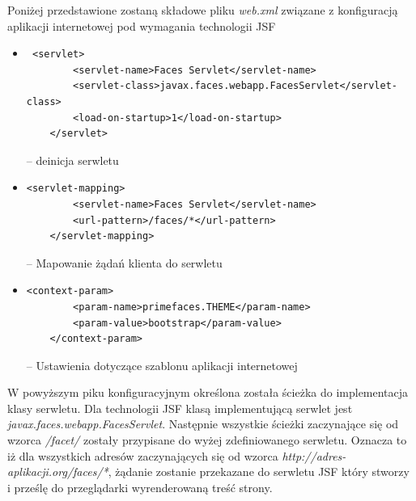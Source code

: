 Poniżej przedstawione zostaną składowe pliku \textit{web.xml} związane z konfiguracją aplikacji internetowej pod wymagania technologii JSF

\begin{itemize}
	\item  {\footnotesize \begin{verbatim} <servlet>
        <servlet-name>Faces Servlet</servlet-name>
        <servlet-class>javax.faces.webapp.FacesServlet</servlet-class>
        <load-on-startup>1</load-on-startup>
    </servlet> \end{verbatim}} -- deinicja serwletu
 	\item  {\footnotesize \begin{verbatim}<servlet-mapping>
        <servlet-name>Faces Servlet</servlet-name>
        <url-pattern>/faces/*</url-pattern>
    </servlet-mapping>\end{verbatim}} -- Mapowanie żądań klienta do serwletu
    
    \item  {\footnotesize \begin{verbatim}<context-param>
        <param-name>primefaces.THEME</param-name>
        <param-value>bootstrap</param-value>
    </context-param>\end{verbatim}} -- Ustawienia dotyczące szablonu aplikacji internetowej
\end{itemize}

W powyższym piku konfiguracyjnym określona została ścieżka do implementacja klasy serwletu. Dla technologii JSF klasą implementującą serwlet jest \textit{javax.faces.webapp.FacesServlet}. Następnie wszystkie ścieżki zaczynające się od wzorca \textit{/facet/} zostały przypisane do wyżej zdefiniowanego serwletu. Oznacza to iż dla wszystkich adresów zaczynających się od wzorca \textit{http://adres-aplikacji.org/faces/*}, żądanie zostanie przekazane do serwletu JSF który stworzy i prześlę do przeglądarki wyrenderowaną treść strony.

